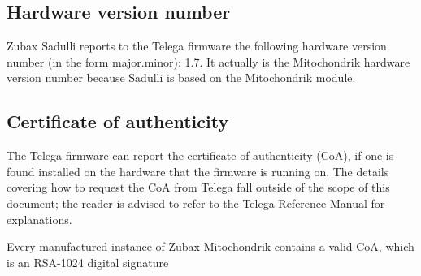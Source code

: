 \documentclass{zubaxdoc}
\begin{document}
\subsection{Hardware version number}

Zubax Sadulli reports to the Telega firmware the following hardware version number
(in the form major.minor): 1.7. It actually is the Mitochondrik hardware version number because Sadulli is based on 
the Mitochondrik module. 

\subsection{Certificate of authenticity}\label{sec:certificate_of_authenticity}

The Telega firmware can report the certificate of authenticity (CoA),
if one is found installed on the hardware that the firmware is running on.
The details covering how to request the CoA from Telega fall outside of the scope of this document;
the reader is advised to refer to the Telega Reference Manual for explanations.

Every manufactured instance of Zubax Mitochondrik contains a valid CoA, which is an RSA-1024 digital signature
\end{document}
